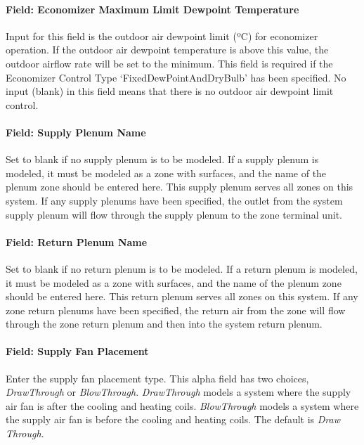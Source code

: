 \paragraph{Field: Economizer Maximum Limit Dewpoint Temperature}\label{field-economizer-maximum-limit-dewpoint-temperature-3}

Input for this field is the outdoor air dewpoint limit (ºC) for economizer operation. If the outdoor air dewpoint temperature is above this value, the outdoor airflow rate will be set to the minimum. This field is required if the Economizer Control Type `FixedDewPointAndDryBulb' has been specified. No input (blank) in this field means that there is no outdoor air dewpoint limit control.

\paragraph{Field: Supply Plenum Name}\label{field-supply-plenum-name-8}

Set to blank if no supply plenum is to be modeled. If a supply plenum is modeled, it must be modeled as a zone with surfaces, and the name of the plenum zone should be entered here. This supply plenum serves all zones on this system. If any supply plenums have been specified, the outlet from the system supply plenum will flow through the supply plenum to the zone terminal unit.

\paragraph{Field: Return Plenum Name}\label{field-return-plenum-name-9}

Set to blank if no return plenum is to be modeled. If a return plenum is modeled, it must be modeled as a zone with surfaces, and the name of the plenum zone should be entered here. This return plenum serves all zones on this system. If any zone return plenums have been specified, the return air from the zone will flow through the zone return plenum and then into the system return plenum.

\paragraph{Field: Supply Fan Placement}\label{field-supply-fan-placement-7}

Enter the supply fan placement type. This alpha field has two choices, \emph{DrawThrough} or \emph{BlowThrough}. \emph{DrawThrough} models a system where the supply air fan is after the cooling and heating coils. \emph{BlowThrough} models a system where the supply air fan is before the cooling and heating coils. The default is \emph{Draw Through}.

